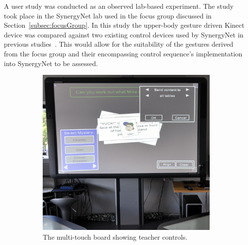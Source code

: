 \documentclass[link]{IWCOMP}
\begin{document}

A user study was conducted as an observed lab-based experiment.
The study took place in the SynergyNet lab used in the focus group discussed in Section~\ref{subsec:focusGroup}.
In this study the upper-body gesture driven Kinect device was compared against two existing control devices used by SynergyNet in previous studies~\cite{Mercier2012}.
This would allow for the suitability of the gestures derived from the focus group and their encompassing control sequence's implementation into SynergyNet to be assessed.

\begin{figure}[h]
	\centering
	\begin{subfigure}[h]{0.23\textwidth}
		\centering
		\includegraphics[width=\textwidth]{figures/control_board.png}
		\caption{The multi-touch board showing teacher controls.}
		\label{fig:controlBoard}
	\end{subfigure}
	\begin{subfigure}[h]{0.23\textwidth}
		\centering

\end{subfigure}
\end{figure}
\end{document}
